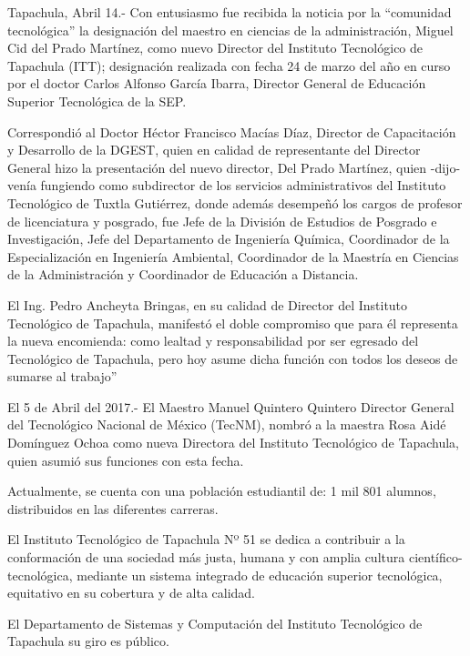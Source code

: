 Tapachula, Abril 14.- Con entusiasmo fue recibida la noticia por la “comunidad tecnológica” la designación del maestro en ciencias de la administración, Miguel Cid del Prado Martínez, como nuevo Director del Instituto Tecnológico de Tapachula (ITT); designación realizada con fecha 24 de marzo del año en curso por el doctor Carlos Alfonso García Ibarra, Director General de Educación Superior Tecnológica de la SEP.

Correspondió al Doctor Héctor Francisco Macías Díaz, Director de Capacitación y Desarrollo de la DGEST, quien en calidad de representante del Director General hizo la presentación del nuevo director, Del Prado Martínez, quien -dijo- venía fungiendo como  subdirector de los servicios administrativos del Instituto Tecnológico de Tuxtla Gutiérrez, donde además desempeñó los cargos de profesor de licenciatura y posgrado, fue Jefe de la División de Estudios de Posgrado e Investigación, Jefe del Departamento de Ingeniería Química, Coordinador de la Especialización en Ingeniería Ambiental, Coordinador de la Maestría en Ciencias de la Administración y Coordinador de Educación a Distancia.

El Ing. Pedro Ancheyta Bringas, en su calidad de Director del Instituto Tecnológico de Tapachula, manifestó el doble compromiso que para él representa la nueva encomienda: como lealtad y responsabilidad por ser egresado del Tecnológico de Tapachula, pero hoy asume dicha función con todos los deseos de sumarse al trabajo”


El 5 de Abril del 2017.- El Maestro Manuel Quintero Quintero Director General del Tecnológico Nacional de México (TecNM), nombró a la maestra Rosa Aidé Domínguez Ochoa como nueva Directora del Instituto Tecnológico de Tapachula, quien asumió sus funciones con esta fecha.


Actualmente, se cuenta con una población estudiantil de: 1 mil 801 alumnos, distribuidos en las diferentes carreras. 

El Instituto Tecnológico de Tapachula Nº 51 se dedica a contribuir a la conformación de una sociedad más justa, humana y con amplia cultura científico-tecnológica, mediante un sistema integrado de educación superior tecnológica, equitativo en su cobertura y de alta calidad.

El Departamento de Sistemas y Computación del Instituto Tecnológico de Tapachula su giro es público.\\


